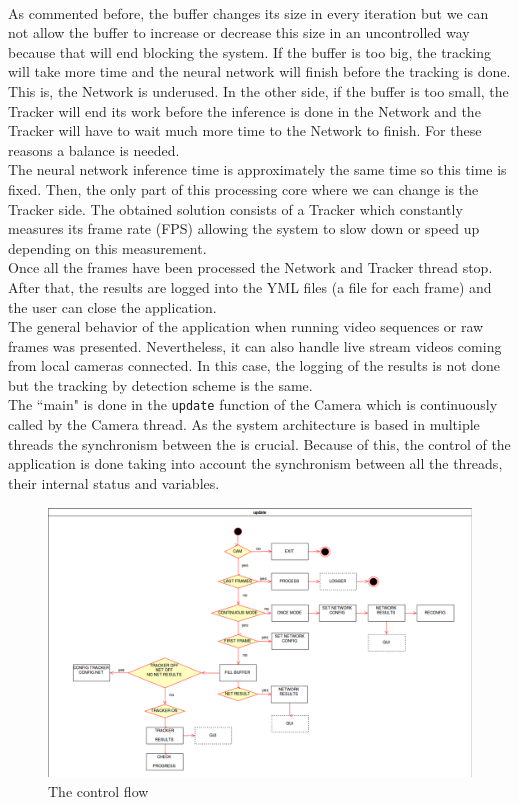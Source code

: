 \\As commented before, the buffer changes its size in every iteration but we can not allow the buffer to increase or decrease this size in an uncontrolled way because that will end blocking the system. If the buffer is too big, the tracking will take more time and the neural network will finish before the tracking is done. This is, the Network is underused. In the other side, if the buffer is too small, the Tracker will end its work before the inference is done in the Network and the Tracker will have to wait much more time to the Network to finish. For these reasons a balance is needed.\\
The neural network inference time is approximately the same time so this time is fixed. Then, the only part of this processing core where we can change is the Tracker side. The obtained solution consists of a Tracker which constantly measures its frame rate (FPS) allowing the system to slow down or speed up depending on this measurement.\\
Once all the frames have been processed the Network and Tracker thread stop. After that, the results are logged into the YML files (a file for each frame) and the user can close the application.\\
The general behavior of the application when running video sequences or raw frames was presented. Nevertheless, it can also handle live stream videos coming from local cameras connected. In this case, the logging of the results is not done but the tracking by detection scheme is the same.\\
The ``main" is done in the \texttt{update} function of the Camera which is continuously called by the Camera thread. As the system architecture is based in multiple threads the synchronism between the is crucial. Because of this, the control of the application is done taking into account the synchronism between all the threads, their internal status and variables.
\begin{figure}[H]
\begin{center}
\includegraphics[scale=0.3]{figures/update_camera.png}
\caption{The control flow}
\label{fig:update_cam}
\end{center}
\end{figure} 

